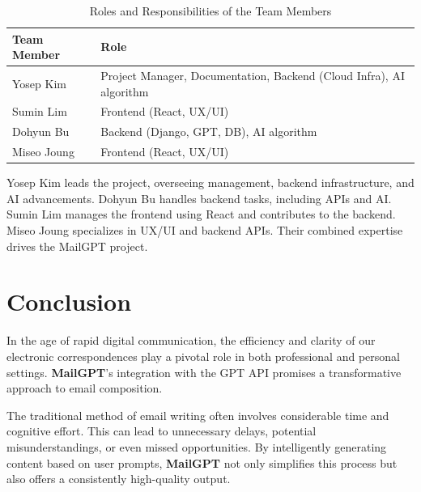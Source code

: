 \documentclass[12pt]{article}
\begin{document}
\begin{table}[ht]
	\centering
	\begin{tabularx}{\textwidth}{|X|X|}
		\hline
		\rowcolor{gray!30}
		Team Member & Role                                                                \\
		\hline
		Yosep Kim   & Project Manager, Documentation, Backend (Cloud Infra), AI algorithm \\
		\hline
		Sumin Lim   & Frontend (React, UX/UI)                                           \\
		\hline
		Dohyun Bu & Backend (Django, GPT, DB), AI algorithm                           \\
		\hline
		Miseo Joung & Frontend (React, UX/UI)                                           \\
		\hline
	\end{tabularx}
	\caption{Roles and Responsibilities of the Team Members}
\end{table}

Yosep Kim leads the project, overseeing management, backend infrastructure, and AI advancements. Dohyun Bu handles backend tasks, including APIs and AI. Sumin Lim manages the frontend using React and contributes to the backend. Miseo Joung specializes in UX/UI and backend APIs. Their combined expertise drives the MailGPT project.

\titleformat{\section}[block]{\normalfont\Large\bfseries\color{darkblue}}{\thesection}{1em}{}

\section*{Conclusion}

In the age of rapid digital communication, the efficiency and clarity of our electronic correspondences play a pivotal role in both professional and personal settings. \textbf{MailGPT}'s integration with the GPT API promises a transformative approach to email composition.

The traditional method of email writing often involves considerable time and cognitive effort. This can lead to unnecessary delays, potential misunderstandings, or even missed opportunities. By intelligently generating content based on user prompts, \textbf{MailGPT} not only simplifies this process but also offers a consistently high-quality output.
\end{document}
